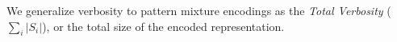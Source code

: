 We generalize verbosity to pattern mixture encodings as the \textit{Total Verbosity} ($\sum_{i}|S_i|$), or the total size of the encoded representation.

